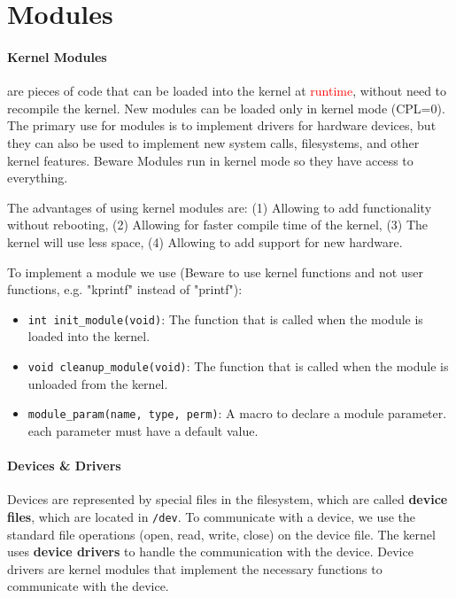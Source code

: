 \documentclass[openany,12pt]{book}
\newcommand{\code}[1]{\texttt{#1}}
\newcommand{\red}[1]{\textcolor{Red}{#1}}
\begin{document}
\section*{Modules}

\paragraph{Kernel Modules} are pieces of code that can be loaded into the kernel at \red{runtime}, without need to recompile the kernel. New modules can be loaded only in kernel mode (CPL=0). The primary use for modules is to implement drivers for hardware devices, but they can also be used to implement new system calls, filesystems, and other kernel features. Beware Modules run in kernel mode so they have access to everything.

The advantages of using kernel modules are: (1) Allowing to add functionality without rebooting, (2) Allowing for faster compile time of the kernel, (3) The kernel will use less space, (4) Allowing to add support for new hardware.


To implement a module we use (Beware to use kernel functions and not user functions, e.g. "kprintf" instead of "printf"):
\begin{itemize}
  \item \code{int init\_module(void)}: The function that is called when the module is loaded into the kernel. 

  \item \code{void cleanup\_module(void)}: The function that is called when the module is unloaded from the kernel.

  \item \code{module\_param(name, type, perm)}: A macro to declare a module parameter. each parameter must have a default value.
\end{itemize}



\paragraph{Devices \& Drivers} Devices are represented by special files in the filesystem, which are called \textbf{device files}, which are located in \code{/dev}. To communicate with a device, we use the standard file operations (open, read, write, close) on the device file. The kernel uses \textbf{device drivers} to handle the communication with the device. Device drivers are kernel modules that implement the necessary functions to communicate with the device.
\end{document}
